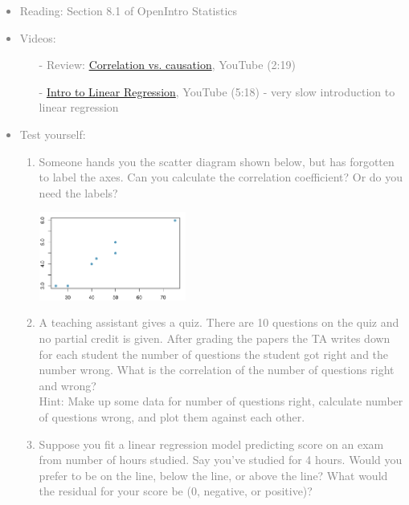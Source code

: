 \documentclass[11pt]{article}
\newcommand{\gray}[1]{\textcolor{gray}{#1}}
\begin{document}
\gray{
{\it
\vspace{-0.55cm}
\begin{itemize}
\renewcommand{\labelitemi}{{\textcolor{dark}{$\ast$}}}
\item Reading: Section 8.1 of OpenIntro Statistics
\item Videos: 
\begin{itemize}
\item[-] Review: \href{http://www.youtube.com/watch?v=5zyruPbgxyM}{Correlation vs. causation}, YouTube (2:19)
\item[-] \href{http://www.youtube.com/watch?v=zPG4NjIkCjc}{Intro to Linear Regression}, YouTube (5:18) - very slow introduction to linear regression
\end{itemize}
\item Test yourself:
\begin{enumerate}
\item Someone hands you the scatter diagram shown below, but has forgotten to label the axes. Can you calculate the correlation coefficient? Or do you need the labels?
\begin{center}
\includegraphics[width=0.4\textwidth]{figures/no_labels}
\end{center}
\item A teaching assistant gives a quiz. There are 10 questions on the quiz and no partial credit is given. After grading the papers the TA writes down for each student the number of questions the student got right and the number wrong. What is the correlation of the number of questions right and wrong? \\
Hint: Make up some data for number of questions right, calculate number of questions wrong, and plot them against each other.
\item Suppose you fit a linear regression model predicting score on an exam from number of hours studied. Say you've studied for 4 hours. Would you prefer to be on the line, below the line, or above the line? What would the residual for your score be (0, negative, or positive)?
\end{enumerate}
\end{itemize}
}}
\end{document}
